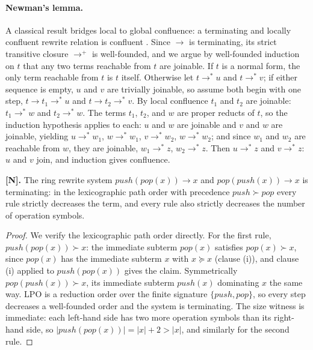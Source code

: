 \paragraph{Newman's lemma.}
A classical result bridges local to global confluence: a terminating and
locally confluent rewrite relation is confluent \cite{newman}. Since $\to$
is terminating, its strict transitive closure $\to^{+}$ is well-founded, and
we argue by well-founded induction on $t$ that any two terms reachable from
$t$ are joinable. If $t$ is a normal form, the only term reachable from $t$
is $t$ itself. Otherwise let $t \to^{*} u$ and $t \to^{*} v$; if either
sequence is empty, $u$ and $v$ are trivially joinable, so assume both begin
with one step, $t \to t_1 \to^{*} u$ and $t \to t_2 \to^{*} v$. By local
confluence $t_1$ and $t_2$ are joinable: $t_1 \to^{*} w$ and
$t_2 \to^{*} w$. The terms $t_1$, $t_2$, and $w$ are proper reducts of $t$,
so the induction hypothesis applies to each: $u$ and $w$ are joinable and
$v$ and $w$ are joinable, yielding $u \to^{*} w_1$, $w \to^{*} w_1$,
$v \to^{*} w_2$, $w \to^{*} w_2$; and since $w_1$ and $w_2$ are reachable
from $w$, they are joinable, $w_1 \to^{*} z$, $w_2 \to^{*} z$. Then
$u \to^{*} z$ and $v \to^{*} z$: $u$ and $v$ join, and induction gives
confluence.

\begin{theorem}\label{nt:13}
\textbf{[N].} The ring rewrite system $\mathit{push}(\mathit{pop}(x)) \to x$
and $\mathit{pop}(\mathit{push}(x)) \to x$ is terminating: in the
lexicographic path order with precedence
$\mathit{push} \succ \mathit{pop}$ every rule strictly decreases the term,
and every rule also strictly decreases the number of operation symbols.
\end{theorem}

\begin{proof}
We verify the lexicographic path order directly. For the first rule,
$\mathit{push}(\mathit{pop}(x)) \succ x$: the immediate subterm
$\mathit{pop}(x)$ satisfies $\mathit{pop}(x) \succ x$, since
$\mathit{pop}(x)$ has the immediate subterm $x$ with $x \succeq x$ (clause
(i)), and clause (i) applied to $\mathit{push}(\mathit{pop}(x))$ gives the
claim. Symmetrically $\mathit{pop}(\mathit{push}(x)) \succ x$, its
immediate subterm $\mathit{push}(x)$ dominating $x$ the same way. LPO is a
reduction order over the finite signature $\{\mathit{push}, \mathit{pop}\}$,
so every step decreases a well-founded order and the system is terminating.
The size witness is immediate: each left-hand side has two more operation
symbols than its right-hand side, so $|\mathit{push}(\mathit{pop}(x))| =
|x| + 2 > |x|$, and similarly for the second rule.
\end{proof}

